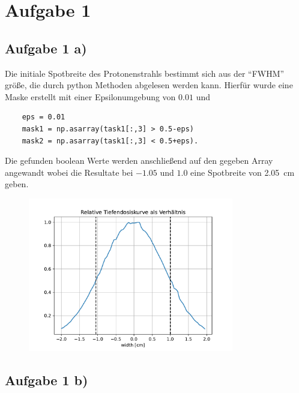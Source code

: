 \section{Aufgabe 1}
\subsection{Aufgabe 1 a)}
Die initiale Spotbreite des Protonenstrahls bestimmt sich aus der \enquote{FWHM} größe, die durch python Methoden abgelesen werden kann.
Hierfür wurde eine Maske erstellt mit einer Epsilonumgebung von $0.01$ und
\begin{verbatim}
    eps = 0.01
    mask1 = np.asarray(task1[:,3] > 0.5-eps)
    mask2 = np.asarray(task1[:,3] < 0.5+eps).
\end{verbatim}
Die gefunden boolean Werte werden anschließend auf den gegeben Array angewandt wobei die Resultate bei $-1.05$ und $1.0$ eine Spotbreite von \SI{2.05}{\cm} geben.
\begin{figure}
    \includegraphics[width = 0.8\textwidth]{../poject/task1/task1a.pdf}
\end{figure}

\subsection{Aufgabe 1 b)}

